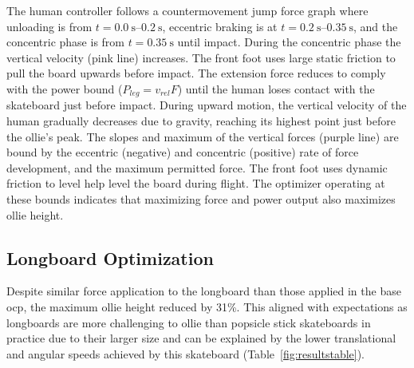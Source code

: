 \documentclass[default,iicol]{sn-jnl}
\begin{document}
The human controller follows a countermovement jump force graph where unloading is from $t=\SIrange{0.0}{0.2}{\second}$, eccentric braking is at $t=\SIrange{0.2}{0.35}{\second}$, and the concentric phase is from $t=\SI{0.35}{\second}$ until impact.
During the concentric phase the vertical velocity (pink line) increases. The front foot uses large static friction to pull the board upwards before impact.
The extension force reduces to comply with the power bound ($P_{leg} = v_{rel} F$) until the human loses contact with the skateboard just before impact.
During upward motion, the vertical velocity of the human gradually decreases due to gravity, reaching its highest point just before the ollie's peak.
The slopes and maximum of the vertical forces (purple line) are bound by the eccentric (negative) and concentric (positive) rate of force development, and the maximum permitted force. The front foot uses dynamic friction to level help level the board during flight.
The optimizer operating at these bounds indicates that maximizing force and power output also maximizes ollie height.

\subsection{Longboard Optimization}
%
Despite similar force application to the longboard than those applied in the base \gls{ocp}, the maximum ollie height reduced by 31\%. This aligned with expectations as longboards are more challenging to ollie than popsicle stick skateboards in practice due to their larger size and can be explained by the lower translational and angular speeds achieved by this skateboard (Table~\ref{fig:resultstable}).
\end{document}
